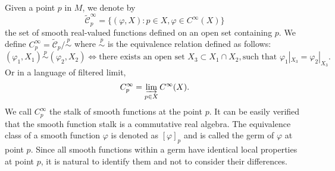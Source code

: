 \documentclass{report}
\begin{document}
Given a point $p$ in $M$, we denote by
\[
    \widetilde{\mathcal{C}}^\infty_p=\{(\varphi,X):p\in X,\varphi\in C^\infty(X)\}
\]
the set of smooth real-valued functions defined on an open set containing $p$. We define $C^\infty_p=\widetilde{\mathcal{C}}_p/\overset{p}\sim$ where $\overset{p}\sim$ is the equivalence relation defined as follows:
\[
    (\varphi_1,X_1)\overset{p}\sim (\varphi_2,X_2)\iff\text{there exists an open set }X_3\subset X_1\cap X_2,\text{such that } \varphi_1|_{X_3}=\varphi_2|_{X_3}.
\]
Or in a language of filtered limit,
\[
    C^\infty_p=\varinjlim_{p\in X}C^\infty(X).
\]
We call $C^\infty_p$ the stalk of smooth functions at the point $p$. It can be easily verified that the smooth function stalk is a commutative real algebra. The equivalence class of a smooth function $\varphi$ is denoted as $[\varphi]_p$ and is called the germ of $\varphi$ at point $p$. Since all smooth functions within a germ have identical local properties at point $p$, it is natural to identify them and not to consider their differences. 
\end{document}
